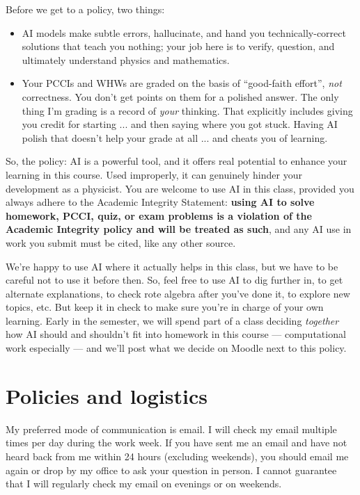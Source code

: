 \documentclass{tufte-handout}
\begin{document}
Before we get to a policy, two things:

\begin{itemize}
  \item AI models make subtle errors, hallucinate, and hand you
    technically-correct solutions that teach you nothing; your job here is to
    verify, question, and ultimately understand physics and mathematics.
  \item Your PCCIs and WHWs are graded on the basis of ``good-faith effort'',
    \textit{not} correctness. You don't get points on them for a polished
    answer. The only thing I'm grading is a record of \emph{your} thinking.
    That explicitly includes giving you credit for starting ... and then saying
    where you got stuck. Having AI polish that doesn't help your grade at all
    ... and cheats you of learning.
\end{itemize}

So, the policy: AI is a powerful tool, and it offers real potential to enhance
your learning in this course. Used improperly, it can genuinely hinder your
development as a physicist. You are welcome to use AI in this class, provided
you always adhere to the Academic Integrity Statement: \textbf{using AI to solve
  homework, PCCI, quiz, or exam problems is a violation of the Academic
  Integrity policy and
  will be treated as such}, and any AI use in work you submit must be cited,
like any other source.

We're happy to use AI where it actually helps in this class, but we have to be
careful not to use it before then. So, feel free to use AI to dig further in, to
get alternate explanations, to check rote algebra after you've done it, to
explore new topics, etc. But keep it in check to make sure you're in charge of
your own learning. Early in the semester, we will spend part of a class deciding
\emph{together} how AI should and shouldn't fit into homework in this course ---
computational work especially --- and we'll post what we decide on Moodle next to
this policy.

\section{Policies and logistics}\label{sec:policies}

 My preferred mode of communication is
email. I will check my email multiple times per day during the work
week. If you have sent me an email and have not heard back from me
within 24 hours (excluding weekends), you should email me again or
drop by my office to ask your question in person. I cannot guarantee
that I will regularly check my email on evenings or on
weekends.
\end{document}
